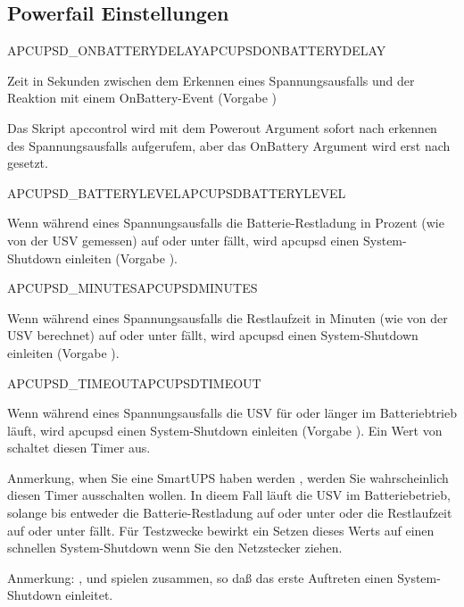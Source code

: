 \subsection{Powerfail Einstellungen}
\begin {description}

 {APCUPSD\_ONBATTERYDELAY}{APCUPSDONBATTERYDELAY}
  
  Zeit in Sekunden zwischen dem Erkennen eines Spannungsausfalls und 
  der Reaktion mit einem OnBattery-Event (Vorgabe )

  Das Skript apccontrol wird mit dem Powerout Argument sofort nach erkennen 
  des Spannungsausfalls aufgerufem, aber das OnBattery Argument wird erst nach 
   gesetzt.  

 {APCUPSD\_BATTERYLEVEL}{APCUPSDBATTERYLEVEL}
 
  Wenn während eines Spannungsausfalls die Batterie-Restladung in Prozent
  (wie von der USV gemessen) auf oder unter  fällt, 
  wird apcupsd einen System-Shutdown einleiten
  (Vorgabe ).

 {APCUPSD\_MINUTES}{APCUPSDMINUTES}
 
  Wenn während eines Spannungsausfalls die Restlaufzeit in Minuten
  (wie von der USV berechnet) auf oder unter   fällt, 
  wird apcupsd einen System-Shutdown einleiten
  (Vorgabe ).

 {APCUPSD\_TIMEOUT}{APCUPSDTIMEOUT}

  Wenn während eines Spannungsausfalls die USV für 
  oder länger im Batteriebtrieb läuft, 
  wird apcupsd einen System-Shutdown einleiten
  (Vorgabe ).
  Ein Wert von  schaltet diesen Timer aus.
 
  Anmerkung, when Sie eine SmartUPS haben werden , werden Sie wahrscheinlich 
  diesen Timer ausschalten wollen.
  In dieem Fall läuft die USV im Batteriebetrieb, solange bis entweder 
  die Batterie-Restladung auf oder unter 
  oder die  Restlaufzeit auf oder unter  fällt.
  Für Testzwecke bewirkt ein Setzen dieses Werts auf  einen
  schnellen System-Shutdown wenn Sie den Netzstecker ziehen.   
 
  Anmerkung: ,  und 
   spielen zusammen, so daß das erste Auftreten einen
  System-Shutdown einleitet.



\end{description}
